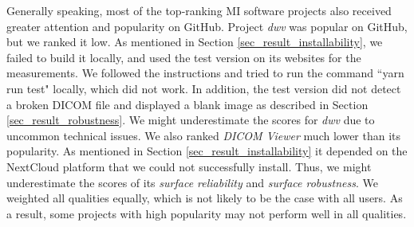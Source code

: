 Generally speaking, most of the top-ranking MI software projects also received greater attention and popularity on GitHub. Project \textit{dwv} was popular on GitHub, but we ranked it low. As mentioned in Section \ref{sec_result_installability}, we failed to build it locally, and used the test version on its websites for the measurements. We followed the instructions and tried to run the command ``yarn run test" locally, which did not work. In addition, the test version did not detect a broken DICOM file and displayed a blank image as described in Section \ref{sec_result_robustness}. We might underestimate the scores for \textit{dwv} due to uncommon technical issues. We also ranked \textit{DICOM Viewer} much lower than its popularity. As mentioned in Section \ref{sec_result_installability} it depended on the NextCloud platform that we could not successfully install. Thus, we might underestimate the scores of its \textit{surface reliability} and \textit{surface robustness}. We weighted all qualities equally, which is not likely to be the case with all users. As a result, some projects with high popularity may not perform well in all qualities.

